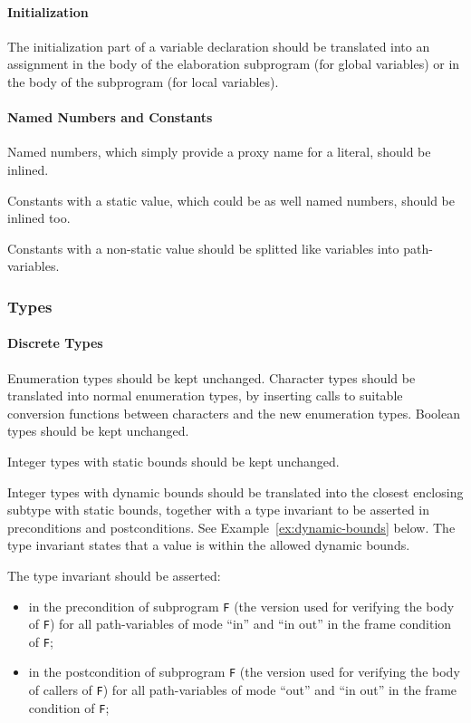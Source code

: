 \documentclass{article}
\begin{document}
\paragraph{Initialization}

The initialization part of a variable declaration should be translated into an
assignment in the body of the elaboration subprogram (for global variables) or
in the body of the subprogram (for local variables).

\paragraph{Named Numbers and Constants}

Named numbers, which simply provide a proxy name for a literal, should be
inlined.

Constants with a static value, which could be as well named numbers, should be
inlined too.

Constants with a non-static value should be splitted like variables into
path-variables.

\subsubsection{Types}
\label{Ada2SPARK:types}

\paragraph{Discrete Types}

Enumeration types should be kept unchanged. Character types should be
translated into normal enumeration types, by inserting calls to suitable
conversion functions between characters and the new enumeration types. Boolean
types should be kept unchanged.

Integer types with static bounds should be kept unchanged.

Integer types with dynamic bounds should be translated into the closest
enclosing subtype with static bounds, together with a type invariant to be
asserted in preconditions and postconditions. See
Example~\ref{ex:dynamic-bounds} below. The type invariant states that a value
is within the allowed dynamic bounds.

The type invariant should be asserted:
\begin{itemize}
\item in the precondition of subprogram \verb|F| (the version used for
  verifying the body of \verb|F|) for all path-variables of mode ``in'' and
  ``in out'' in the frame condition of \verb|F|;
\item in the postcondition of subprogram \verb|F| (the version used for
  verifying the body of callers of \verb|F|) for all path-variables of mode
  ``out'' and ``in out'' in the frame condition of \verb|F|;
\end{itemize}
\end{document}
